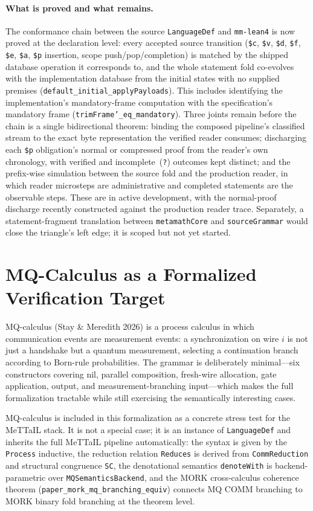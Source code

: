 \documentclass[11pt]{article}
\newcommand{\code}[1]{\texttt{#1}}
\begin{document}
\paragraph{What is proved and what remains.}
The conformance chain between the source \code{LanguageDef} and \code{mm-lean4} is
now proved at the declaration level: every accepted source transition
(\code{\$c}, \code{\$v}, \code{\$d}, \code{\$f}, \code{\$e}, \code{\$a},
\code{\$p} insertion, scope push/pop/completion) is matched by the shipped
database operation it corresponds to, and the whole statement fold co-evolves
with the implementation database from the initial states with no supplied
premises (\code{default\_initial\_applyPayloads}).  This includes identifying
the implementation's mandatory-frame computation with the specification's
mandatory frame (\code{trimFrame'\_eq\_mandatory}).  Three joints remain
before the chain is a single bidirectional theorem: binding the composed
pipeline's classified stream to the exact byte representation the verified
reader consumes; discharging each \code{\$p} obligation's normal or compressed
proof from the reader's own chronology, with verified and
incomplete~(\code{?}) outcomes kept distinct; and the prefix-wise simulation
between the source fold and the production reader, in which reader microsteps
are administrative and completed statements are the observable steps.  These
are in active development, with the normal-proof discharge recently
constructed against the production reader trace.  Separately, a
statement-fragment translation between \code{metamathCore} and
\code{sourceGrammar} would close the triangle's left edge; it is scoped but
not yet started.

\section{MQ-Calculus as a Formalized Verification Target}

MQ-calculus (Stay \& Meredith 2026) is a process calculus in which communication
events are measurement events: a synchronization on wire $i$ is not just a
handshake but a quantum measurement, selecting a continuation branch according
to Born-rule probabilities.  The grammar is deliberately minimal---six
constructors covering nil, parallel composition, fresh-wire allocation, gate
application, output, and measurement-branching input---which makes the full
formalization tractable while still exercising the semantically interesting cases.

MQ-calculus is included in this formalization as a concrete stress test for the
MeTTaIL stack.  It is not a special case; it is an instance of \code{LanguageDef}
and inherits the full MeTTaIL pipeline automatically: the syntax is given by the
\code{Process} inductive, the reduction relation \code{Reduces} is derived from
\code{CommReduction} and structural congruence \code{SC}, the denotational
semantics \code{denoteWith} is backend-parametric over \code{MQSemanticsBackend},
and the MORK cross-calculus coherence theorem
(\code{paper\_mork\_mq\_branching\_equiv}) connects MQ COMM branching to MORK
binary fold branching at the theorem level.
\end{document}
